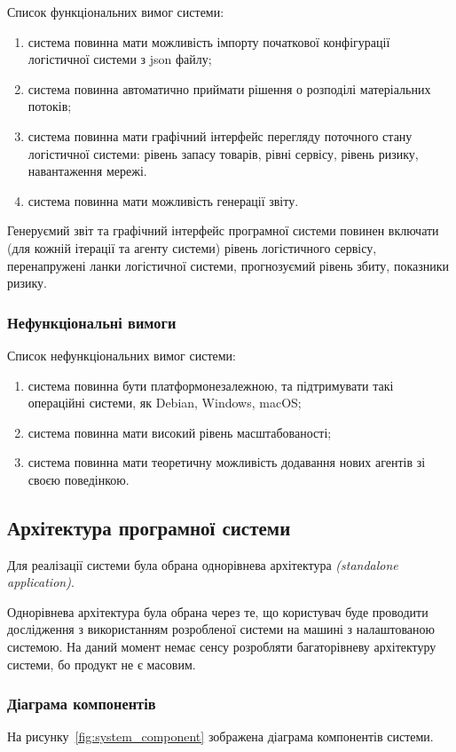 Список функціональних вимог системи:
\begin{enumerate}[label={\arabic*)}]
	\item система повинна мати можливість імпорту початкової конфігурації логістичної системи з \acrshort{json} файлу;
	\item система повинна автоматично приймати рішення о розподілі матеріальних потоків;
	\item система повинна мати графічний інтерфейс перегляду поточного стану логістичної системи: рівень запасу товарів, рівні сервісу, рівень ризику, навантаження мережі. 
	\item система повинна мати можливість генерації звіту.
\end{enumerate}

Генеруємий звіт та графічний інтерфейс програмної системи повинен включати (для кожній ітерації та агенту системи) рівень логістичного сервісу, перенапружені ланки логістичної системи, прогнозуємий рівень збиту, показники ризику.

\subsubsection{Нефункціональні вимоги}
Список нефункціональних вимог системи:
\begin{enumerate}[label={\arabic*)}]
	\item система повинна бути платформонезалежною, та підтримувати такі операційні системи, як Debian, Windows, macOS;
	\item система повинна мати високий рівень масштабованості;
	\item система повинна мати теоретичну можливість додавання нових агентів зі своєю поведінкою.
\end{enumerate}

\subsection{Архітектура програмної системи}
Для реалізації системи була обрана однорівнева архітектура \textit{(standalone application)}.

Однорівнева архітектура була обрана через те, що користувач буде проводити дослідження з використанням розробленої системи на машині з налаштованою системою. 
На даний момент немає сенсу розробляти багаторівневу архітектуру системи, бо продукт не є масовим.

\subsubsection{Діаграма компонентів}
На рисунку~\ref{fig:system_component} зображена діаграма компонентів системи.

